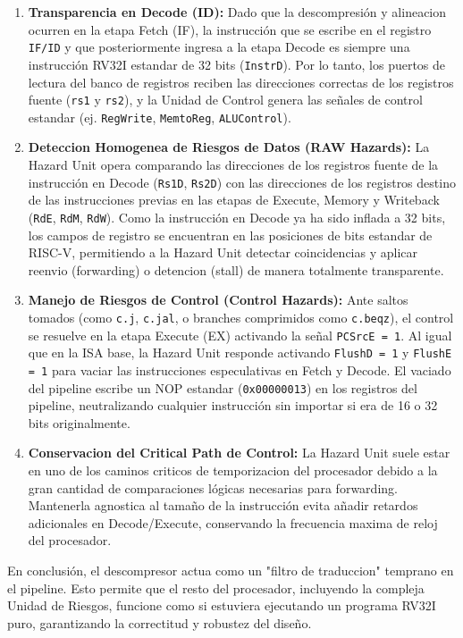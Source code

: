 \documentclass[12pt, a4paper]{article}
\begin{document}
\begin{enumerate}
    \item \textbf{Transparencia en Decode (ID):} Dado que la descompresión y alineacion ocurren en la etapa Fetch (IF), la instrucción que se escribe en el registro \texttt{IF/ID} y que posteriormente ingresa a la etapa Decode es siempre una instrucción RV32I estandar de 32 bits (\texttt{InstrD}). Por lo tanto, los puertos de lectura del banco de registros reciben las direcciones correctas de los registros fuente (\texttt{rs1} y \texttt{rs2}), y la Unidad de Control genera las señales de control estandar (ej. \texttt{RegWrite}, \texttt{MemtoReg}, \texttt{ALUControl}).
    \item \textbf{Deteccion Homogenea de Riesgos de Datos (RAW Hazards):} La Hazard Unit opera comparando las direcciones de los registros fuente de la instrucción en Decode (\texttt{Rs1D}, \texttt{Rs2D}) con las direcciones de los registros destino de las instrucciones previas en las etapas de Execute, Memory y Writeback (\texttt{RdE}, \texttt{RdM}, \texttt{RdW}). Como la instrucción en Decode ya ha sido inflada a 32 bits, los campos de registro se encuentran en las posiciones de bits estandar de RISC-V, permitiendo a la Hazard Unit detectar coincidencias y aplicar reenvio (forwarding) o detencion (stall) de manera totalmente transparente.
    \item \textbf{Manejo de Riesgos de Control (Control Hazards):} Ante saltos tomados (como \texttt{c.j}, \texttt{c.jal}, o branches comprimidos como \texttt{c.beqz}), el control se resuelve en la etapa Execute (EX) activando la señal \texttt{PCSrcE = 1}. Al igual que en la ISA base, la Hazard Unit responde activando \texttt{FlushD = 1} y \texttt{FlushE = 1} para vaciar las instrucciones especulativas en Fetch y Decode. El vaciado del pipeline escribe un NOP estandar (\texttt{0x00000013}) en los registros del pipeline, neutralizando cualquier instrucción sin importar si era de 16 o 32 bits originalmente.
    \item \textbf{Conservacion del Critical Path de Control:} La Hazard Unit suele estar en uno de los caminos criticos de temporizacion del procesador debido a la gran cantidad de comparaciones lógicas necesarias para forwarding. Mantenerla agnostica al tamaño de la instrucción evita añadir retardos adicionales en Decode/Execute, conservando la frecuencia maxima de reloj del procesador.
\end{enumerate}
En conclusión, el descompresor actua como un "filtro de traduccion" temprano en el pipeline. Esto permite que el resto del procesador, incluyendo la compleja Unidad de Riesgos, funcione como si estuviera ejecutando un programa RV32I puro, garantizando la correctitud y robustez del diseño.
\end{document}
